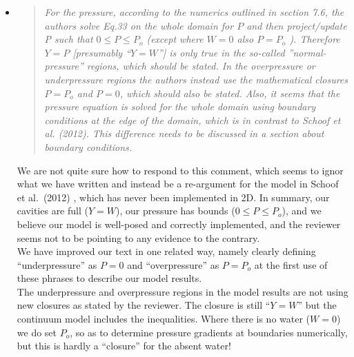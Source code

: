 \documentclass[11pt,reqno]{amsart}
\newcommand{\reply}[2]{
\medskip\medskip
\item  \begin{quote}
\emph{#1}
\end{quote}

\medskip
\noindent #2}
\begin{document}
\begin{itemize}
\reply{For the pressure, according to the numerics outlined in section 7.6, the authors solve Eq.33 on the whole domain for $P$ and then project/update P such that $0 \le P \le P_o$ (except where $W = 0$ also $P = P_o$ ).  Therefore $Y = P$ [presumably ``$Y=W$''] is only true in the so-called ''normal-pressure'' regions, which should be stated. In the overpressure or underpressure regions the authors instead use the mathematical closures $P = P_o$ and $P = 0$, which should also be stated.  Also, it seems that the pressure equation is solved for the whole domain using boundary conditions at the edge of the domain, which is in contrast to Schoof et al. (2012). This difference needs to be discussed in a section about boundary conditions.}
{We are not quite sure how to respond to this comment, which seems to ignor what we have written and instead be a re-argument for the model in Schoof et al.~(2012) \cite{Schoofetal2012}, which has never been implemented in 2D.  In summary, our cavities are full ($Y=W$), our pressure has bounds ($0\le P \le P_o$), and we believe our model is well-posed and correctly implemented, and the reviewer seems not to be pointing to any evidence to the contrary. \\
\indent We have improved our text in one related way, namely clearly defining ``underpressure'' as $P=0$ and ``overpressure'' as $P= P_o$ at the first use of these phrases to describe our model results.\\
\indent The underpressure and overpressure regions in the model results are not using new closures as stated by the reviewer.  The closure is still ``$Y=W$'' but the continuum model includes the inequalities.   Where there is no water ($W=0$) we do set $P_o$, so as to determine pressure gradients at boundaries numerically, but this is hardly a ``closure'' for the absent water!}


\end{itemize}
\end{document}
